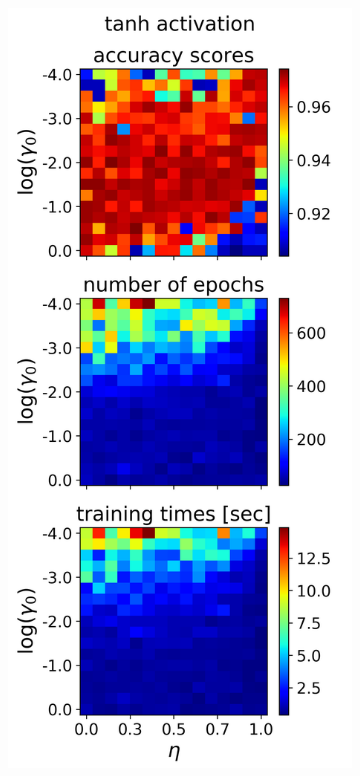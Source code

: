 \documentclass[nofootinbib,reprint,english]{revtex4-1}
\begin{document}
\begin{figure}[h!]
\begin{subfigure}{0.32\textwidth}
	\end{subfigure}
	~
	\begin{subfigure}{0.32\textwidth}
	\centering
	\includegraphics[scale=0.38]{../results/NN/img/gridsearch2_tanh1.png}

\end{subfigure}
\end{figure}
\end{document}
